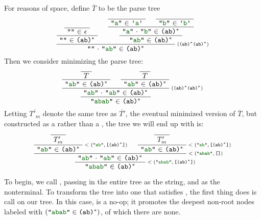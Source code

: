     For reasons of space, define $\overline{T}$ to be the parse tree
    \[
      \AxiomC{} \UnaryInfC{\str{} $\in$ $\epsilon$}
      \UnaryInfC{\str{} $\in$ \regex{(ab)$^*$}}
      \AxiomC{}\UnaryInfC{\str{a} $\in$ \terminal{a}}
      \AxiomC{}\UnaryInfC{\str{b} $\in$ \terminal{b}}
      \BinaryInfC{\llstrcat{\str{a}}{\str{b}} $\in$ \regex{(ab)$^*$}}
      \UnaryInfC{\str{ab} $\in$ \regex{(ab)$^*$}}
      \RightLabel{\scriptsize(\regex{(ab)$^*$(ab)$^*$})}
      \BinaryInfC{\llstrcat{\str{}}{\str{ab}} $\in$ \regex{(ab)$^*$}}
    \DisplayProof
    \]
    Then we consider minimizing the parse tree:
    \[
      \AxiomC{}
      \UnaryInfC{$T$}
      \UnaryInfC{\str{ab} $\in$ \regex{(ab)$^*$}}
      \AxiomC{}
      \UnaryInfC{$T$}
      \UnaryInfC{\str{ab} $\in$ \regex{(ab)$^*$}}
      \RightLabel{\scriptsize(\regex{(ab)$^*$(ab)$^*$})}
      \BinaryInfC{\llstrcat{\str{ab}}{\str{ab}} $\in$ \regex{(ab)$^*$}}
      \UnaryInfC{\str{abab} $\in$ \regex{(ab)$^*$}}
    \DisplayProof
    \]
    Letting $\overline{T'_m}$ denote the same tree as $\overline{T'}$, the eventual minimized version of $\overline{T}$, but constructed as a  rather than a ,
    the tree we will end up with is:
    \[
      \AxiomC{}\UnaryInfC{$T'_m$}
      \RightLabel{\scriptsize\minparsetreeannot{\str{ab}}{\valuelist{\regex{(ab)$^*$}}}}
      \UnaryInfC{\str{ab} $\in$ \regex{(ab)$^*$}}
      \AxiomC{}\UnaryInfC{$T'_m$}
      \RightLabel{\scriptsize\minparsetreeannot{\str{ab}}{\valuelist{\regex{(ab)$^*$}}}}
      \UnaryInfC{\str{ab} $\in$ \regex{(ab)$^*$}}
      \RightLabel{\scriptsize\minparsetreeannot{\str{abab}}{\nil}}
      \BinaryInfC{\llstrcat{\str{ab}}{\str{ab}} $\in$ \regex{(ab)$^*$}}
      \RightLabel{\scriptsize\minparsetreeannot{\str{abab}}{\valuelist{\regex{(ab)$^*$}}}}
      \UnaryInfC{\str{abab} $\in$ \regex{(ab)$^*$}}
    \DisplayProof
    \]

    To begin, we call , passing in the entire tree as the string, and  as the nonterminal.  To transform the tree into one that satisfies , the first thing  does is call  on our tree.  In this case,  is a no-op; it promotes the deepest non-root nodes labeled with $(\str{abab}\in\regex{(ab)$^*$})$, of which there are none.

